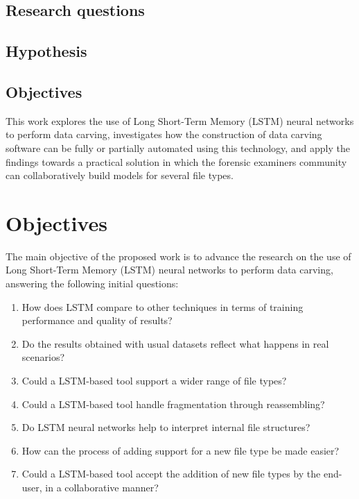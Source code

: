 

\subsection{Research questions}
\subsection{Hypothesis}

\subsection{Objectives}
This work explores the use of Long Short-Term Memory (LSTM) neural networks to perform data carving, investigates how the construction of data carving software can be fully or partially automated using this technology, and apply the findings towards a practical solution in which the forensic examiners community can collaboratively build models for several file types.

\section{Objectives}

The main objective of the proposed work is to advance the research on the use of Long Short-Term Memory (LSTM) neural networks to perform data carving, answering the following initial questions:

\begin{enumerate}[itemindent=\parindent,label=\textbf{Q\arabic*.}]
  \item How does LSTM compare to other techniques in terms of training performance and quality of results?
  \item Do the results obtained with usual datasets reflect what happens in real scenarios?
  \item Could a LSTM-based tool support a wider range of file types?
   \item Could a LSTM-based tool handle fragmentation through reassembling?
   \item Do LSTM neural networks help to interpret internal file structures?
  \item How can the process of adding support for a new file type be made easier?
  \item Could a LSTM-based tool accept the addition of new file types by the end-user, in a collaborative manner? 
  \end{enumerate}




